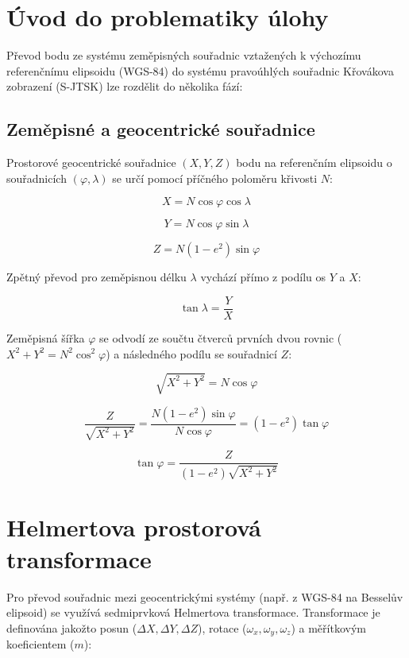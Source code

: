 \documentclass[12pt, a4paper]{article}
\begin{document}
\newpage
\section{Úvod do problematiky úlohy}
Převod bodu ze systému zeměpisných souřadnic vztažených k výchozímu referenčnímu elipsoidu (WGS-84) do systému pravoúhlých souřadnic Křovákova zobrazení (S-JTSK) lze rozdělit do několika fází:
\subsection*{Zeměpisné a geocentrické souřadnice}
Prostorové geocentrické souřadnice $(X, Y, Z)$ bodu na referenčním elipsoidu o souřadnicích $(\varphi, \lambda)$ se určí pomocí příčného poloměru křivosti $N$:

\[ X = N \cos \varphi \cos \lambda \]

\[ Y = N \cos \varphi \sin \lambda \]

\[ Z = N (1 - e^2) \sin \varphi \]
\vspace{3mm}

\noindent Zpětný převod pro zeměpisnou délku $\lambda$ vychází přímo z podílu os $Y$ a $X$:
\vspace{3mm}

\[ \tan \lambda = \frac{Y}{X} \]
\vspace{3mm}

\noindent Zeměpisná šířka $\varphi$ se odvodí ze součtu čtverců prvních dvou rovnic ($X^2 + Y^2 = N^2 \cos^2 \varphi$) a následného podílu se souřadnicí $Z$:
\vspace{3mm}

\[ \sqrt{X^2 + Y^2} = N \cos \varphi \]
\vspace{3mm}

\[ \frac{Z}{\sqrt{X^2 + Y^2}} = \frac{N (1 - e^2) \sin \varphi}{N \cos \varphi} = (1 - e^2) \tan \varphi \]
\vspace{3mm}

\[ \tan \varphi = \frac{Z}{(1 - e^2)\sqrt{X^2 + Y^2}} \]


\newpage
\section*{Helmertova prostorová transformace}
\vspace{5mm}
Pro převod souřadnic mezi geocentrickými systémy (např. z WGS-84 na Besselův elipsoid) se využívá sedmiprvková Helmertova transformace. Transformace je definována jakožto posun ($\Delta X, \Delta Y, \Delta Z$), rotace ($\omega_x, \omega_y, \omega_z$) a měřítkovým koeficientem ($m$):
\end{document}

